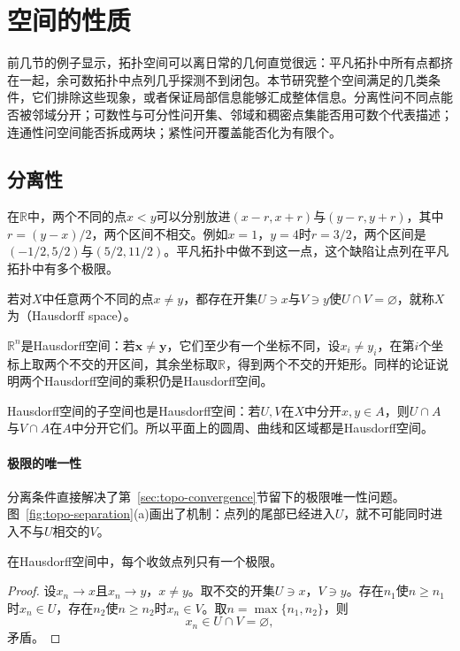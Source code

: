 \section{空间的性质}
\label{sec:topo-properties}

前几节的例子显示，拓扑空间可以离日常的几何直觉很远：平凡拓扑中所有点都挤在一起，余可数拓扑中点列几乎探测不到闭包。本节研究整个空间满足的几类条件，它们排除这些现象，或者保证局部信息能够汇成整体信息。分离性问不同点能否被邻域分开；可数性与可分性问开集、邻域和稠密点集能否用可数个代表描述；连通性问空间能否拆成两块；紧性问开覆盖能否化为有限个。

\subsection{分离性}
\label{sec:topo-separation}

在$\mathbb R$中，两个不同的点$x<y$可以分别放进$(x-r,x+r)$与$(y-r,y+r)$，其中$r=(y-x)/2$，两个区间不相交。例如$x=1$，$y=4$时$r=3/2$，两个区间是$(-1/2,5/2)$与$(5/2,11/2)$。平凡拓扑中做不到这一点，这个缺陷让点列在平凡拓扑中有多个极限。

\begin{definition}[Hausdorff空间]
\label{def:topo-hausdorff}
若对$X$中任意两个不同的点$x\neq y$，都存在开集$U\ni x$与$V\ni y$使$U\cap V=\varnothing$，就称$X$为（Hausdorff space）。
\end{definition}

$\mathbb R^n$是Hausdorff空间：若$\bm x\neq\bm y$，它们至少有一个坐标不同，设$x_i\neq y_i$，在第$i$个坐标上取两个不交的开区间，其余坐标取$\mathbb R$，得到两个不交的开矩形。同样的论证说明两个Hausdorff空间的乘积仍是Hausdorff空间。

Hausdorff空间的子空间也是Hausdorff空间：若$U,V$在$X$中分开$x,y\in A$，则$U\cap A$与$V\cap A$在$A$中分开它们。所以平面上的圆周、曲线和区域都是Hausdorff空间。

\paragraph{极限的唯一性}
分离条件直接解决了第~\ref{sec:topo-convergence}节留下的极限唯一性问题。图~\ref{fig:topo-separation}(a)画出了机制：点列的尾部已经进入$U$，就不可能同时进入不与$U$相交的$V$。

\begin{theorem}[Hausdorff空间中极限唯一]
\label{thm:topo-hausdorff-unique-limit}
在Hausdorff空间中，每个收敛点列只有一个极限。
\end{theorem}
\begin{proof}
设$x_n\to x$且$x_n\to y$，$x\neq y$。取不交的开集$U\ni x$，$V\ni y$。存在$n_1$使$n\geq n_1$时$x_n\in U$，存在$n_2$使$n\geq n_2$时$x_n\in V$。取$n=\max\{n_1,n_2\}$，则
\[
 x_n\in U\cap V=\varnothing,
\]
矛盾。
\end{proof}

